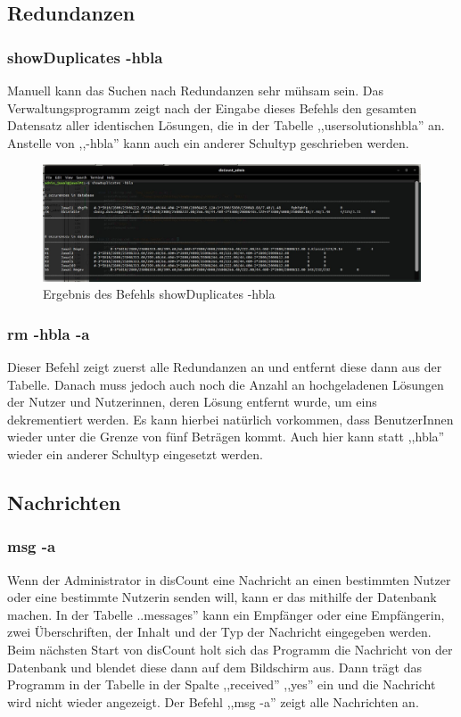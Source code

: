 \documentclass[12pt]{report}
\begin{document}
\subsection{Redundanzen}

\subsubsection{showDuplicates -hbla}
Manuell kann das Suchen nach Redundanzen sehr mühsam sein. Das Verwaltungsprogramm zeigt nach der Eingabe dieses Befehls den gesamten Datensatz aller identischen Lösungen, die in der Tabelle ,,usersolutionshbla'' an. Anstelle von ,,-hbla'' kann auch ein anderer Schultyp geschrieben werden.

\begin{figure}[h]
	\centering
	\includegraphics[width=15cm]{images/showDuplicates_hbla}
	\caption[Befehl showDuplicates -hbla]{Ergebnis des Befehls showDuplicates -hbla}
\end{figure}


\subsubsection{rm -hbla -a}
Dieser Befehl zeigt zuerst alle Redundanzen an und entfernt diese dann aus der Tabelle. Danach muss jedoch auch noch die Anzahl an hochgeladenen Lösungen der Nutzer und Nutzerinnen, deren Lösung entfernt wurde, um eins dekrementiert werden. Es kann hierbei natürlich vorkommen, dass BenutzerInnen wieder unter die Grenze von fünf Beträgen kommt. Auch hier kann statt ,,hbla'' wieder ein anderer Schultyp eingesetzt werden.

\subsection{Nachrichten}

\subsubsection{msg -a}
Wenn der Administrator in disCount eine Nachricht an einen bestimmten Nutzer oder eine bestimmte Nutzerin senden will, kann er das mithilfe der Datenbank machen. In der Tabelle ..messages'' kann ein Empfänger oder eine Empfängerin, zwei Überschriften, der Inhalt und der Typ der Nachricht eingegeben werden. Beim nächsten Start von disCount holt sich das Programm die Nachricht von der Datenbank und blendet diese dann auf dem Bildschirm aus. Dann trägt das Programm in der Tabelle in der Spalte ,,received'' ,,yes'' ein und die Nachricht wird nicht wieder angezeigt. Der Befehl ,,msg -a'' zeigt alle Nachrichten an.
\end{document}
